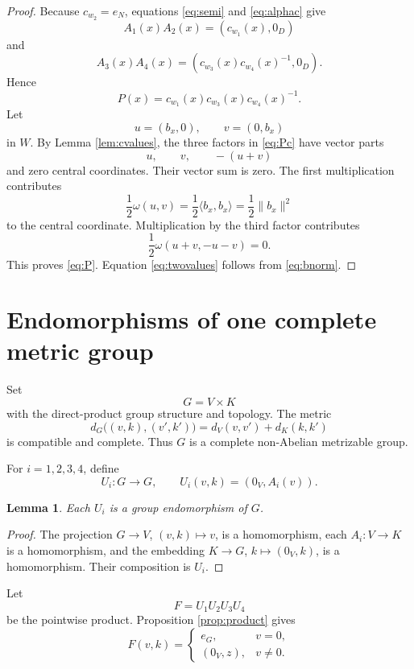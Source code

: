 \documentclass[11pt]{article}
\newtheorem{lemma}[theorem]{Lemma}
\theoremstyle{remark}
\begin{document}
\begin{proof}
Because $c_{w_2}=e_N$, equations \eqref{eq:semi} and \eqref{eq:alphac} give
\[
A_1(x)A_2(x)=(c_{w_1}(x),0_D)
\]
and
\[
A_3(x)A_4(x)=
(c_{w_3}(x)c_{w_4}(x)^{-1},0_D).
\]
Hence
\begin{equation}\label{eq:Pc}
P(x)=c_{w_1}(x)c_{w_3}(x)c_{w_4}(x)^{-1}.
\end{equation}
Let
\[
u=(b_x,0),
\qquad
v=(0,b_x)
\]
in $W$. By Lemma \ref{lem:cvalues}, the three factors in \eqref{eq:Pc} have vector parts
\[
u,\qquad v,\qquad -(u+v)
\]
and zero central coordinates. Their vector sum is zero. The first multiplication contributes
\[
\frac12\omega(u,v)=\frac12\langle b_x,b_x\rangle
=\frac12\|b_x\|^2
\]
to the central coordinate. Multiplication by the third factor contributes
\[
\frac12\omega(u+v,-u-v)=0.
\]
This proves \eqref{eq:P}. Equation \eqref{eq:twovalues} follows from \eqref{eq:bnorm}.
\end{proof}

\section{Endomorphisms of one complete metric group}

Set
\[
G=V\times K
\]
with the direct-product group structure and topology. The metric
\[
d_G\bigl((v,k),(v',k')\bigr)=d_V(v,v')+d_K(k,k')
\]
is compatible and complete. Thus $G$ is a complete non-Abelian metrizable group.

For $i=1,2,3,4$, define
\begin{equation}\label{eq:Ui}
U_i:G\longrightarrow G,
\qquad
U_i(v,k)=(0_V,A_i(v)).
\end{equation}

\begin{lemma}\label{lem:Ui}
Each $U_i$ is a group endomorphism of $G$.
\end{lemma}

\begin{proof}
The projection $G\to V$, $(v,k)\mapsto v$, is a homomorphism, each $A_i:V\to K$ is a homomorphism, and the embedding $K\to G$, $k\mapsto(0_V,k)$, is a homomorphism. Their composition is $U_i$.
\end{proof}

Let
\[
F=U_1U_2U_3U_4
\]
be the pointwise product. Proposition \ref{prop:product} gives
\begin{equation}\label{eq:F}
F(v,k)=
\begin{cases}
e_G,&v=0,\\[2mm]
(0_V,z),&v\ne0.
\end{cases}
\end{equation}
\end{document}
